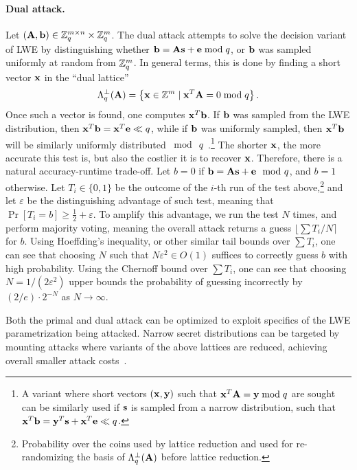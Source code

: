 \paragraph{Dual attack.}
Let $(\mathbf{A}, \mathbf{b}) \in \mathbb{Z}_q^{m \times n} \times \mathbb{Z}_q^m$. The dual attack attempts to solve the decision variant of LWE by distinguishing whether $\mathbf{b} = \mathbf{A} \mathbf{s} + \mathbf{e} \bmod q$, or $\mathbf{b}$ was sampled uniformly at random from $\mathbb{Z}_q^m$. In general terms, this is done by finding a short vector $\mathbf{x}$ in the ``dual lattice''
\[
\Lambda_q^\perp(\mathbf{A}) = \left\{\mathbf{x} \in \mathbb{Z}^m \mid \mathbf{x}^T \mathbf{A} = 0 \bmod q \right\}.
\]
Once such a vector is found, one computes $\mathbf{x}^T \mathbf{b}$. If $\mathbf{b}$ was sampled from the LWE distribution, then \mbox{$\mathbf{x}^T \mathbf{b} = \mathbf{x}^T \mathbf{e} \ll q$}, while if $\mathbf{b}$ was uniformly sampled, then $\mathbf{x}^T \mathbf{b}$ will be similarly uniformly distributed $\bmod~q$~\cite{PQCBook:MicReg09}.\footnote{A variant where short vectors $(\mathbf{x}, \mathbf{y})$ such that $\mathbf{x}^T \mathbf{A} = \mathbf{y} \bmod q$ are sought can be similarly used if $\mathbf{s}$ is sampled from a narrow distribution, such that \mbox{$\mathbf{x}^T \mathbf{b} = \mathbf{y}^T \mathbf{s} + \mathbf{x}^T \mathbf{e} \ll q$}.}
The shorter $\mathbf{x}$, the more accurate this test is, but also the costlier it is to recover $\mathbf{x}$. Therefore, there is a natural accuracy-runtime trade-off.
Let $b = 0$ if $\mathbf{b} = \mathbf{A} \mathbf{s} + \mathbf{e} \mod q$, and $b = 1$ otherwise. Let $T_i \in \{0, 1\}$ be the outcome of the $i$-th run of the test above,\footnote{Probability over the coins used by lattice reduction and used for re-randomizing the basis of $\Lambda_q^\perp(\mathbf{A})$ before lattice reduction.} and let $\varepsilon$ be the distinguishing advantage of such test, meaning that $\Pr[T_i = b] \ge \frac{1}{2} + \varepsilon$. To amplify this advantage, we run the test $N$ times, and perform majority voting, meaning the overall attack returns a guess $\lfloor \sum T_i / N \rceil$ for $b$. Using Hoeffding's inequality, or other similar tail bounds over $\sum T_i$, one can see that choosing $N$ such that $N \varepsilon^2 \in O(1)$ suffices to correctly guess $b$ with high probability. Using the Chernoff bound over $\sum T_i$, one can see that choosing $N = 1/(2 \varepsilon^2)$ upper bounds the probability of guessing incorrectly by $(2/e) \cdot 2^{-N}$ as $N \rightarrow \infty$.

Both the primal and dual attack can be optimized to exploit specifics of the LWE parametrization being attacked. Narrow secret distributions can be targeted by mounting attacks where variants of the above lattices are reduced, achieving overall smaller attack costs~\cite{ACISP:BaiGal14,EC:Albrecht17,_INDOCRYPT:EJK20,AC:GuoJoh21,MATZOV22}.


